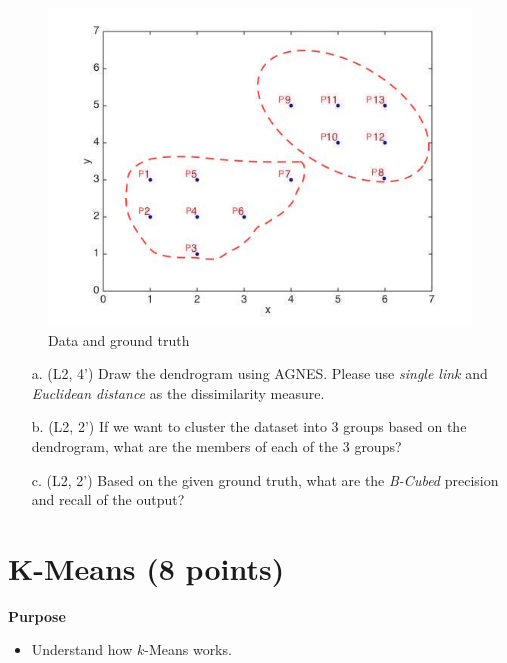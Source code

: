 \begin{figure}[htbp]
\begin{minipage}[b]{.5\textwidth}
     \centering
        \includegraphics[width=\textwidth]{fig/clustering_truth.jpg}
    \end{minipage}
    \caption{Data and ground truth}
    \label{clustering_data}
\end{figure}

\begin{itemize}
\item[a.]  (L2, 4') Draw the dendrogram using AGNES. Please use {\it single link} and {\it Euclidean
distance} as the dissimilarity measure.

\item[b.]  (L2, 2') If we want to cluster
the dataset into 3 groups based on the dendrogram, what are the members of each of the 3 groups? 

\item[c.]  (L2, 2')  Based on the given ground
truth, what are the {\it B-Cubed} precision and recall of the
output? 
\end{itemize}

\section {K-Means (8 points)}

\textbf{Purpose} 
\begin{itemize}
	\item Understand how $k$-Means works.
\end{itemize}

